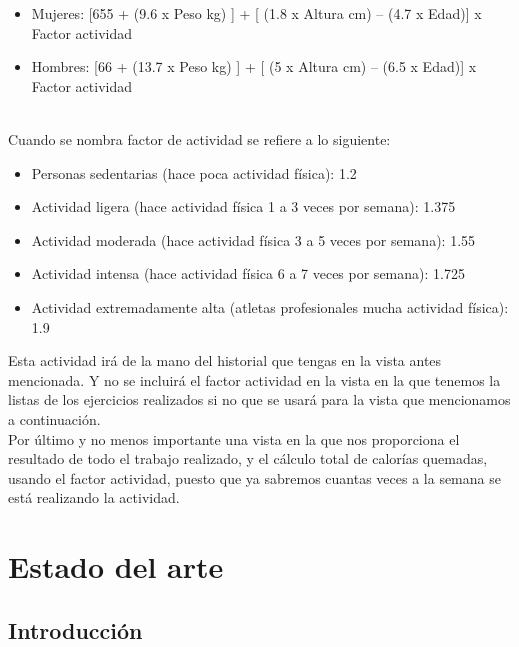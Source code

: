 \documentclass[a4paper, 11pt]{article}
\begin{document}
      \begin{itemize}
        \item{Mujeres:  [655 + (9.6 x Peso kg) ] + [ (1.8 x Altura cm) – (4.7 x Edad)] x Factor actividad}
        \item{Hombres:  [66 + (13.7 x Peso kg) ] + [ (5 x Altura cm) – (6.5 x Edad)] x Factor actividad}
      \end{itemize}
        \\Cuando se nombra factor de actividad se refiere a lo siguiente:
      \begin{itemize}
        \item{Personas sedentarias (hace poca actividad física): 1.2}
        \item{Actividad ligera (hace actividad física 1 a 3 veces por semana): 1.375}
        \item{Actividad moderada (hace actividad física 3 a 5 veces por semana): 1.55}
        \item{Actividad intensa (hace actividad física 6 a 7 veces por semana): 1.725}
        \item{Actividad extremadamente alta (atletas profesionales mucha actividad física): 1.9}
      \end{itemize}

      Esta actividad irá de la mano del historial que tengas en la vista antes
      mencionada. Y no se incluirá el factor actividad en la vista en la que tenemos
      la listas de los ejercicios realizados si no que se usará para la vista que
      mencionamos a continuación.\\

      Por último y no menos importante una vista en la que nos proporciona el
      resultado de todo el trabajo realizado, y el cálculo total de calorías quemadas,
      usando el factor actividad, puesto que ya sabremos cuantas veces a la semana se
      está realizando la actividad.\\



\section{Estado del arte}

    \subsection{Introducción}
\end{document}
